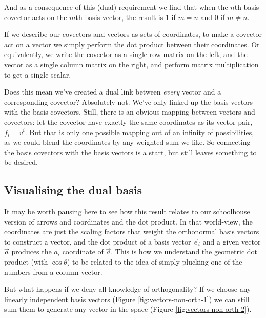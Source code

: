 And as a consequence of this (dual) requirement we find that when the $n$th basis covector acts on the $m$th basis vector, the result is $1$ if $m = n$ and $0$ if $m \ne n$.

If we describe our covectors and vectors as sets of coordinates, to make a covector act on a vector we simply perform the dot product between their coordinates. Or equivalently, we write the covector as a single row matrix on the left, and the vector as a single column matrix on the right, and perform matrix multiplication to get a single scalar.

Does this mean we've created a dual link between \textit{every} vector and a corresponding covector? Absolutely not. We've only linked up the basis vectors with the basis covectors. Still, there is an obvious mapping between vectors and covectors: let the covector have exactly the same coordinates as its vector pair, $f_i = v^i$. But that is only one possible mapping out of an infinity of possibilities, as we could blend the coordinates by any weighted sum we like. So connecting the basis covectors with the basis vectors is a start, but still leaves something to be desired.

\subsection{Visualising the dual basis}

It may be worth pausing here to see how this result relates to our schoolhouse version of arrows and coordinates and the dot product. In that world-view, the coordinates are just the scaling factors that weight the orthonormal basis vectors to construct a vector, and the dot product of a basis vector $\vec{e}_i$ and a given vector $\vec{a}$ produces the $a_i$ coordinate of $\vec{a}$. This is how we understand the geometric dot product (with $\cos \theta$) to be related to the idea of simply plucking one of the numbers from a column vector.

But what happens if we deny all knowledge of orthogonality? If we choose any linearly independent basis vectors (Figure \ref{fig:vectors-non-orth-1}) we can still sum them to generate any vector in the space (Figure \ref{fig:vectors-non-orth-2}).

